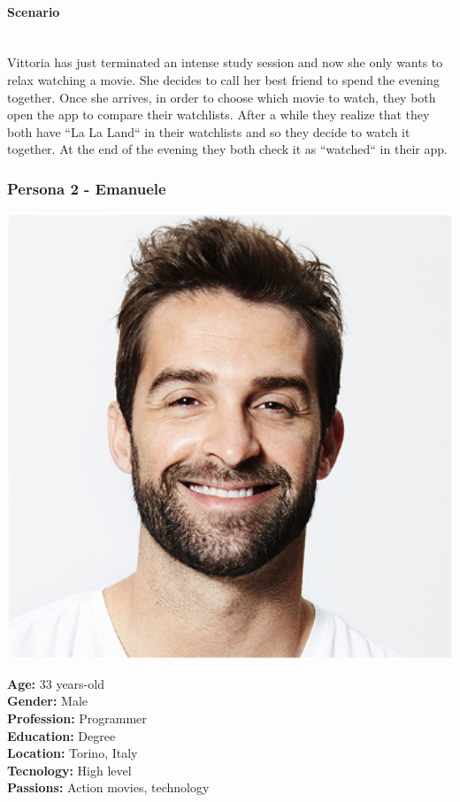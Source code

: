 \documentclass[12pt, a4paper]{article}
\numberwithin{figure}{section}
\begin{document}
\paragraph{Scenario}\mbox{}\\
Vittoria has just terminated an intense study session and now she only wants to
relax watching a movie. She decides to call her best friend to spend the evening together.
Once she arrives, in order to choose which movie to watch, they both open the app to
compare their watchlists. After a while they realize that they both have “La La Land“ in their
watchlists and so they decide to watch it together.
At the end of the evening they both check it as “watched“ in their app.

\subsubsection{Persona 2 - Emanuele}

\begin{minipage}{0.3\textwidth}
	\includegraphics[width=1\textwidth]{images/emanuele.png}
\end{minipage}
\hspace{0.02\linewidth}
\begin{minipage}{0.65\textwidth}
	\textbf{Age:} 33 years-old\\
	\textbf{Gender:} Male\\
	\textbf{Profession:} Programmer\\
	\textbf{Education:} Degree\\
	\textbf{Location:} Torino, Italy\\
	\textbf{Tecnology:} High level\\
	\textbf{Passions:} Action movies, technology\\
\end{minipage}
\end{document}
